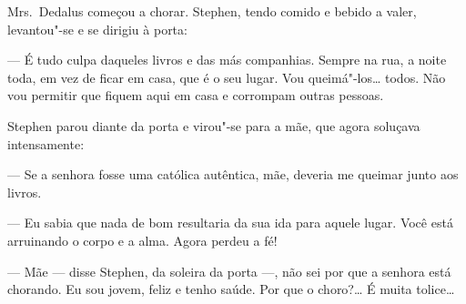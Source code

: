 Mrs.~Dedalus começou a chorar.  Stephen, tendo comido e bebido a valer,
levantou"-se e se dirigiu à porta:

--- É tudo culpa daqueles livros e das más companhias.  Sempre na rua, a noite
toda, em vez de ficar em casa, que é o seu lugar.  Vou queimá"-los\ldots{} todos.
Não vou permitir que fiquem aqui em casa e corrompam outras pessoas.

Stephen parou diante da porta e virou"-se para a mãe, que agora soluçava
intensamente:

--- Se a senhora fosse uma católica autêntica, mãe, deveria me queimar junto
aos livros.

--- Eu sabia que nada de bom resultaria da sua ida para aquele lugar.  Você
está arruinando o corpo e a alma.  Agora perdeu a fé! 

--- Mãe --- disse Stephen, da soleira da porta ---, não sei por que a senhora
está chorando.  Eu sou jovem, feliz e tenho saúde.  Por que o choro?\ldots{}  É
muita tolice\ldots{}

